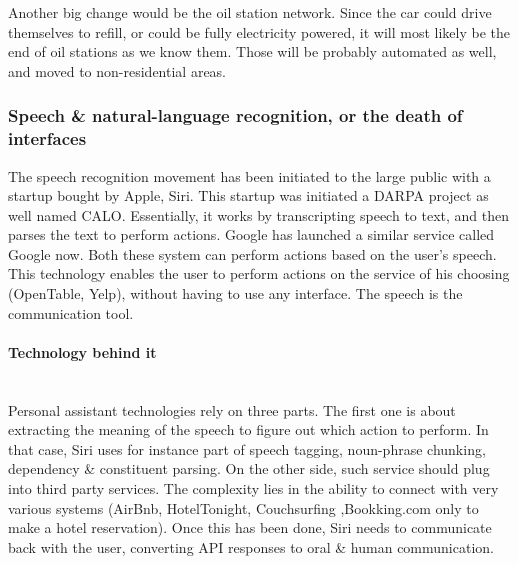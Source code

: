 \documentclass[12pt]{article}
\begin{document}
\vspace{5mm}

Another big change would be the oil station network. Since the car could drive
themselves to refill, or could be fully electricity powered, it will most likely
be the end of oil stations as we know them. Those will be probably automated as
well, and moved to non-residential areas.


\subsubsection{Speech \& natural-language recognition, or the death of interfaces}

The speech recognition movement has been initiated to the large public with a
startup bought by Apple, Siri. This startup was initiated a DARPA project as
well named CALO. Essentially, it works by transcripting speech to text, and then
parses the text to perform actions. Google has launched a similar service called
Google now. Both these system can perform actions based on the user's speech.
This technology enables the user to perform actions on the service of his
choosing (OpenTable, Yelp), without having to use any interface. The speech is
the communication tool.
\\
\paragraph{Technology behind it}
\\
Personal assistant technologies rely on three parts.
The first one is about extracting the meaning of the speech to figure out which
action to perform. In that case, Siri uses for instance part of speech tagging,
noun-phrase chunking, dependency \& constituent parsing. On the other side,
such service should plug into third party services. The complexity lies in the
ability to connect with very various systems (AirBnb, HotelTonight, Couchsurfing
,Bookking.com only to make a hotel reservation). Once this has been done, Siri
needs to communicate back with the user, converting API responses to oral \&
human communication.
\\
\end{document}
